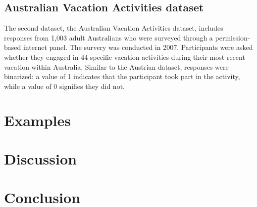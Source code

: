 \documentclass[article]{ajs}
\begin{document}
\subsection{Australian Vacation Activities dataset}

The second dataset, the Australian Vacation Activities dataset, includes responses from 1,003 adult Australians who were surveyed through a permission-based internet panel. The survery was conducted in 2007. Participants were asked whether they engaged in 44 specific vacation activities during their most recent vacation within Australia. Similar to the Austrian dataset, responses were binarized: a value of 1 indicates that the participant took part in the activity, while a value of 0 signifies they did not.

\section{Examples}


\section{Discussion}


\section{Conclusion}

%

\end{document}
